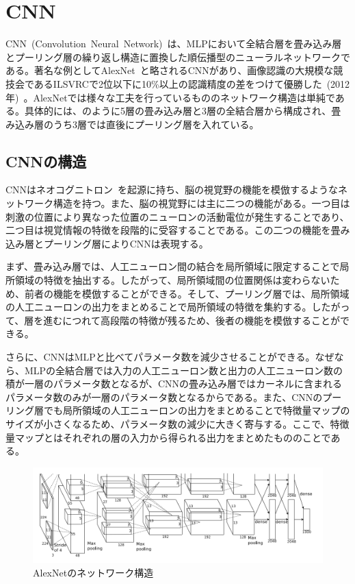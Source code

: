 \section{CNN}

CNN~(Convolution~Neural~Network)~は、MLPにおいて全結合層を畳み込み層とプーリング層の繰り返し構造に置換した順伝播型のニューラルネットワークである。著名な例としてAlexNet~\cite{AlexNet}と略されるCNNがあり、画像認識の大規模な競技会であるILSVRCで2位以下に10\%以上の認識精度の差をつけて優勝した~(2012年)~。AlexNetでは様々な工夫を行っているもののネットワーク構造は単純である。具体的には、のように5層の畳み込み層と3層の全結合層から構成され、畳み込み層のうち3層では直後にプーリング層を入れている。

\subsection{CNNの構造}

CNNはネオコグニトロン~\cite{neocognition}を起源に持ち、脳の視覚野の機能を模倣するようなネットワーク構造を持つ。また、脳の視覚野には主に二つの機能がある。一つ目は刺激の位置により異なった位置のニューロンの活動電位が発生することであり、二つ目は視覚情報の特徴を段階的に受容することである。この二つの機能を畳み込み層とプーリング層によりCNNは表現する。

まず、畳み込み層では、人工ニューロン間の結合を局所領域に限定することで局所領域の特徴を抽出する。したがって、局所領域間の位置関係は変わらないため、前者の機能を模倣することができる。そして、プーリング層では、局所領域の人工ニューロンの出力をまとめることで局所領域の特徴を集約する。したがって、層を進むにつれて高段階の特徴が残るため、後者の機能を模倣することができる。

さらに、CNNはMLPと比べてパラメータ数を減少させることができる。なぜなら、MLPの全結合層では入力の人工ニューロン数と出力の人工ニューロン数の積が一層のパラメータ数となるが、CNNの畳み込み層ではカーネルに含まれるパラメータ数のみが一層のパラメータ数となるからである。また、CNNのプーリング層でも局所領域の人工ニューロンの出力をまとめることで特徴量マップのサイズが小さくなるため、パラメータ数の減少に大きく寄与する。ここで、特徴量マップとはそれぞれの層の入力から得られる出力をまとめたもののことである。

\begin{figure}[b]
\centering
\includegraphics[width=\hsize]{figure/alex.png}
\caption{AlexNetのネットワーク構造}
\label{fig:Alex}
\end{figure}

